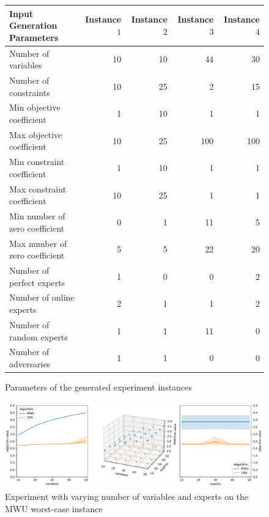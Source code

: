 \begin{figure}[!ht]
\centering
\begin{tabular}{l|r|r|r|r}
Input Generation Parameters & Instance $1$ & Instance $2$ & Instance $3$ & Instance $4$ \\
\hline
Number of variables            & 10 & 10 & 44  & 30 \\
Number of constraints          & 10 & 25 & 2   & 15 \\
Min objective coefficient      & 1  & 10 & 1   & 1  \\
Max objective coefficient      & 10 & 25 & 100 & 100\\
Min constraint coefficient     & 1  & 10 & 1   & 1 \\
Max constraint coefficient     & 10 & 25 & 1   & 1 \\
Min number of zero coefficient & 0  &  1 & 11  & 5 \\
Max number of zero coefficient & 5  &  5 & 22  & 20 \\
Number of perfect experts      & 1  &  0 & 0   & 2 \\
Number of online experts       & 2  &  1 & 1   & 2 \\
Number of random experts       & 1  &  1 & 11  & 0 \\
Number of adversaries          & 1  &  1 & 0   & 0 \\
\end{tabular}
\caption{Parameters of the generated experiment instances}
\label{fig:exp-params}
\end{figure}

\begin{figure}[!ht]
    \centering
    \includegraphics[width=\linewidth]{Img/worst_case_figure.pdf}
    \caption{Experiment with varying number of variables and experts on the MWU worst-case instance}
    \label{fig:exp-3d}
\end{figure}
